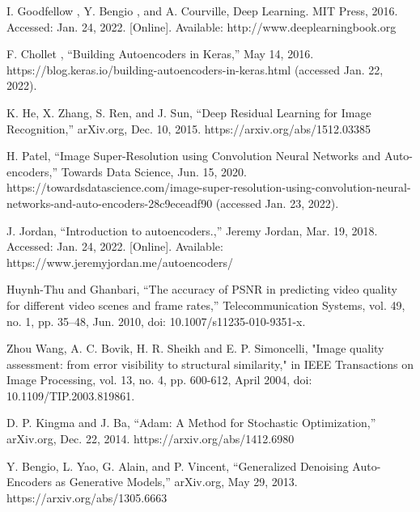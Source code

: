\documentclass[conference]{IEEEtran}
\begin{document}
\begin{thebibliography}{00}
  	
  	 I. Goodfellow , Y. Bengio , and A. Courville, Deep Learning. MIT Press, 2016. Accessed: Jan. 24, 2022. [Online]. Available: http://www.deeplearningbook.org
  	
  	 F. Chollet , “Building Autoencoders in Keras,” May 14, 2016. https://blog.keras.io/building-autoencoders-in-keras.html (accessed Jan. 22, 2022).

	 K. He, X. Zhang, S. Ren, and J. Sun, “Deep Residual Learning for Image Recognition,” arXiv.org, Dec. 10, 2015. https://arxiv.org/abs/1512.03385
	
	 H. Patel, “Image Super-Resolution using Convolution Neural Networks and Auto-encoders,” Towards Data Science, Jun. 15, 2020. https://towardsdatascience.com/image-super-resolution-using-convolution-neural-networks-and-auto-encoders-28c9eceadf90 (accessed Jan. 23, 2022).
	

	 J. Jordan, “Introduction to autoencoders.,” Jeremy Jordan, Mar. 19, 2018. Accessed: Jan. 24, 2022. [Online]. Available: https://www.jeremyjordan.me/autoencoders/

	 Huynh-Thu and Ghanbari, “The accuracy of PSNR in predicting video quality for different video scenes and frame rates,” Telecommunication Systems, vol. 49, no. 1, pp. 35–48, Jun. 2010, doi: 10.1007/s11235-010-9351-x.
	
	 Zhou Wang, A. C. Bovik, H. R. Sheikh and E. P. Simoncelli, "Image quality assessment: from error visibility to structural similarity," in IEEE Transactions on Image Processing, vol. 13, no. 4, pp. 600-612, April 2004, doi: 10.1109/TIP.2003.819861.

	 D. P. Kingma and J. Ba, “Adam: A Method for Stochastic Optimization,” arXiv.org, Dec. 22, 2014. https://arxiv.org/abs/1412.6980
		
	 Y. Bengio, L. Yao, G. Alain, and P. Vincent, “Generalized Denoising Auto-Encoders as Generative Models,” arXiv.org, May 29, 2013. https://arxiv.org/abs/1305.6663
	
	

\end{thebibliography}
\end{document}
